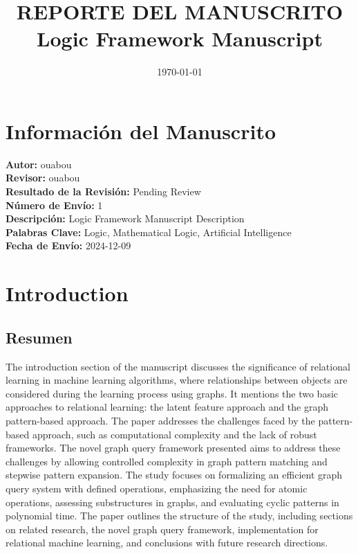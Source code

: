 \documentclass{article}%
\title{REPORTE DEL MANUSCRITO Logic Framework Manuscript}%
\author{}%
\date{\today}%
\begin{document}
%
\normalsize%
\maketitle%
\section{Información del Manuscrito}%
\label{sec:InformacindelManuscrito}%
\textbf{Autor: }%
ouabou%
\\%
\textbf{Revisor: }%
ouabou%
\\%
\textbf{Resultado de la Revisión: }%
Pending Review%
\\%
\textbf{Número de Envío: }%
1%
\\%
\textbf{Descripción: }%
Logic Framework Manuscript Description%
\\%
\textbf{Palabras Clave: }%
Logic, Mathematical Logic, Artificial Intelligence%
\\%
\textbf{Fecha de Envío: }%
2024{-}12{-}09

%
\section{Introduction}%
\label{sec:Introduction}%
\subsection{Resumen}%
\label{subsec:Resumen}%
The introduction section of the manuscript discusses the significance of relational learning in machine learning algorithms, where relationships between objects are considered during the learning process using graphs. It mentions the two basic approaches to relational learning: the latent feature approach and the graph pattern{-}based approach. The paper addresses the challenges faced by the pattern{-}based approach, such as computational complexity and the lack of robust frameworks. The novel graph query framework presented aims to address these challenges by allowing controlled complexity in graph pattern matching and stepwise pattern expansion. The study focuses on formalizing an efficient graph query system with defined operations, emphasizing the need for atomic operations, assessing substructures in graphs, and evaluating cyclic patterns in polynomial time. The paper outlines the structure of the study, including sections on related research, the novel graph query framework, implementation for relational machine learning, and conclusions with future research directions.
\end{document}
